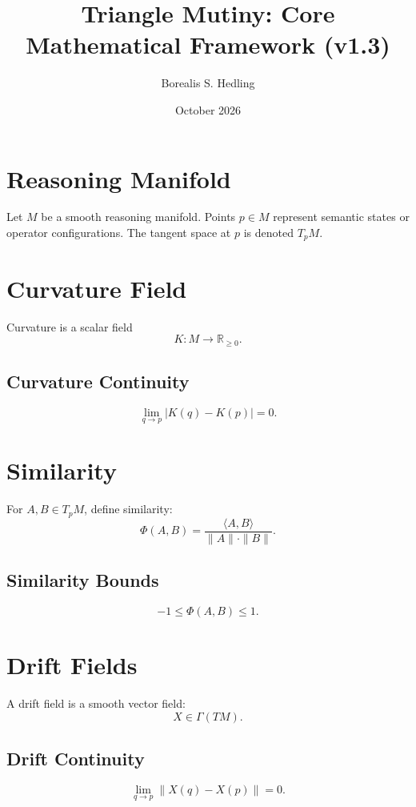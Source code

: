 \documentclass[11pt]{article}
\title{Triangle Mutiny: Core Mathematical Framework (v1.3)}
\author{Borealis S. Hedling}
\date{October 2026}
\begin{document}
\maketitle

\section{Reasoning Manifold}

Let $M$ be a smooth reasoning manifold. Points $p \in M$ represent semantic
states or operator configurations. The tangent space at $p$ is denoted $T_pM$.

\section{Curvature Field}

Curvature is a scalar field
\[
K : M \to \mathbb{R}_{\ge 0}.
\]

\subsection{Curvature Continuity}
\[
\lim_{q \to p} |K(q) - K(p)| = 0.
\]

\section{Similarity}

For $A, B \in T_pM$, define similarity:
\[
\Phi(A,B)
  = \frac{\langle A, B \rangle}{\|A\| \cdot \|B\|}.
\]

\subsection{Similarity Bounds}
\[
-1 \le \Phi(A,B) \le 1.
\]

\section{Drift Fields}

A drift field is a smooth vector field:
\[
X \in \Gamma(TM).
\]

\subsection{Drift Continuity}
\[
\lim_{q \to p} \|X(q) - X(p)\| = 0.
\]
\end{document}
